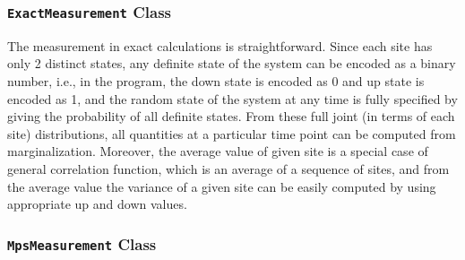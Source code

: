 \documentclass[english]{article}[12pt]
\begin{document}
\subsubsection{\texttt{ExactMeasurement} Class}

The measurement in exact calculations is straightforward. Since each site has only 2 distinct states, any definite state of the system can be encoded as a binary number, i.e., in  the program, the down state is encoded as 0 and up state is encoded as 1, and the random state of the system at any time is fully specified by giving the probability of all definite states. From these full joint (in terms of each site) distributions, all quantities at a particular time point can be computed from marginalization. Moreover, the average value of given site is a special case of general correlation function, which is an average of a sequence of sites, and from the average value the variance of a given site can be easily computed by using appropriate up and down values.



\subsubsection{\texttt{MpsMeasurement} Class}
\end{document}
